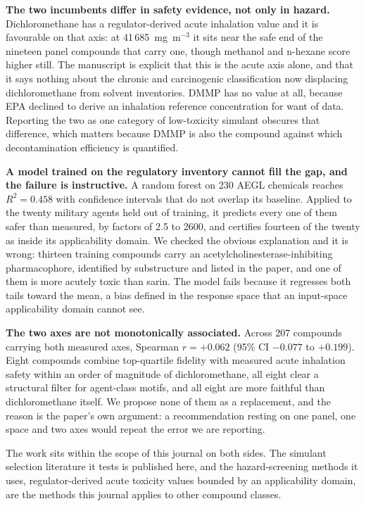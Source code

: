 \documentclass[11pt,a4paper]{article}
\begin{document}
\textbf{The two incumbents differ in safety evidence, not only in hazard.}
Dichloromethane has a regulator-derived acute inhalation value and it is
favourable on that axis: at 41\,685~mg~m$^{-3}$ it sits near the safe end of the
nineteen panel compounds that carry one, though methanol and n-hexane score
higher still. The manuscript is explicit that this is the acute axis alone,
and that it says nothing about the chronic and carcinogenic classification
now displacing dichloromethane from solvent inventories. DMMP has no value
at all, because EPA declined to derive an inhalation reference concentration for
want of data. Reporting the two as one category of low-toxicity simulant
obscures that difference, which matters because DMMP is also the compound against
which decontamination efficiency is quantified.

\textbf{A model trained on the regulatory inventory cannot fill the gap, and the
failure is instructive.} A random forest on 230 AEGL chemicals reaches
$R^{2}=0.458$ with confidence intervals that do not overlap its baseline. Applied
to the twenty military agents held out of training, it predicts every one of them
safer than measured, by factors of 2.5 to 2600, and certifies fourteen of the
twenty as inside its applicability domain. We checked the obvious explanation and
it is wrong: thirteen training compounds carry an acetylcholinesterase-inhibiting
pharmacophore, identified by substructure and listed in the paper, and one of
them is more acutely toxic than sarin. The model fails because it regresses both
tails toward the mean, a bias defined in the response space that an input-space
applicability domain cannot see.

\textbf{The two axes are not monotonically associated.} Across 207 compounds
carrying both measured axes, Spearman $r = +0.062$ (95\% CI $-0.077$ to
$+0.199$). Eight
compounds combine top-quartile fidelity with measured acute inhalation safety
within an order of magnitude of dichloromethane, all eight clear a structural
filter for agent-class motifs, and all eight are more faithful than
dichloromethane itself. We propose none of them as a replacement, and the reason
is the paper's own argument: a recommendation resting on one panel, one space and
two axes would repeat the error we are reporting.

The work sits within the scope of this journal on both sides. The simulant
selection literature it tests is published here, and the hazard-screening
methods it uses, regulator-derived acute toxicity values bounded by an
applicability domain, are the methods this journal applies to other compound
classes.
\end{document}
